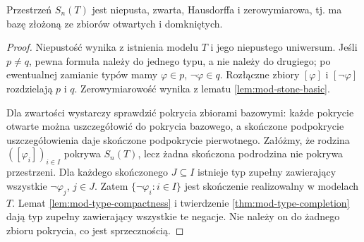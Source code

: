 \begin{twierdzenie}
\label{thm:mod-stone-compact}
Przestrzeń $S_n(T)$ jest niepusta, zwarta, Hausdorffa
i zerowymiarowa, tj. ma bazę złożoną ze zbiorów otwartych
i domkniętych.
\end{twierdzenie}
\begin{proof}
Niepustość wynika z istnienia modelu $T$ i jego niepustego
uniwersum. Jeśli $p\ne q$, pewna formuła należy do jednego
typu, a nie należy do drugiego; po ewentualnej zamianie
typów mamy $\varphi\in p$, $\neg\varphi\in q$.
Rozłączne zbiory $[\varphi]$ i $[\neg\varphi]$ rozdzielają
$p$ i $q$. Zerowymiarowość wynika z lematu \ref{lem:mod-stone-basic}.

Dla zwartości wystarczy sprawdzić pokrycia zbiorami bazowymi:
każde pokrycie otwarte można uszczegółowić do pokrycia bazowego,
a skończone podpokrycie uszczegółowienia daje skończone
podpokrycie pierwotnego. Załóżmy, że rodzina
$([\varphi_i])_{i\in I}$ pokrywa $S_n(T)$, lecz żadna skończona
podrodzina nie pokrywa przestrzeni. Dla każdego skończonego
$J\subseteq I$ istnieje typ zupełny zawierający wszystkie
$\neg\varphi_j$, $j\in J$. Zatem
$\{\neg\varphi_i:i\in I\}$ jest skończenie realizowalny
w modelach $T$. Lemat \ref{lem:mod-type-compactness} i twierdzenie
\ref{thm:mod-type-completion} dają typ zupełny zawierający
wszystkie te negacje. Nie należy on do żadnego zbioru
pokrycia, co jest sprzecznością.
\end{proof}

